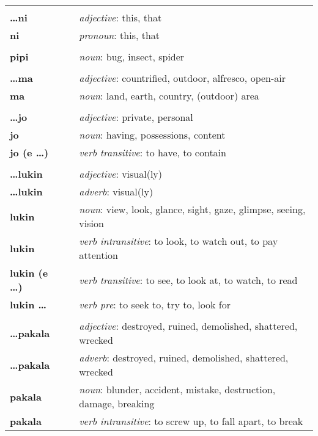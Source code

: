\begin{supertabular}{p{2,5cm}|ll}
 && \\ %
\textbf{\dots ni} && \textit{adjective}: this, that \\ %
\textbf{ni} && \textit{pronoun}: this, that \\ %
 && \\ %
\textbf{pipi} && \textit{noun}: bug, insect, spider \\ %
 && \\ %
\textbf{\dots ma} && \textit{adjective}: countrified, outdoor, alfresco, open-air \\ %
\textbf{ma} && \textit{noun}: land, earth, country, (outdoor) area \\ %
 && \\ %
\textbf{\dots jo} && \textit{adjective}: private, personal \\ %
\textbf{jo} && \textit{noun}: having, possessions, content \\ %
\textbf{jo (e \dots)} && \textit{verb transitive}: to have, to contain \\ %
 && \\ %
\textbf{\dots lukin} && \textit{adjective}: visual(ly) \\ %
\textbf{\dots lukin} && \textit{adverb}: visual(ly) \\ %
\textbf{lukin} && \textit{noun}: view, look, glance, sight, gaze, glimpse, seeing, vision \\ %
\textbf{lukin} && \textit{verb intransitive}: to look, to watch out, to pay attention \\ %
\textbf{lukin (e \dots)} && \textit{verb transitive}: to see, to look at, to watch, to read \\ %
\textbf{lukin \dots} && \textit{verb pre}: to seek to, try to, look for \\ %
 && \\ %
\textbf{\dots pakala} && \textit{adjective}: destroyed, ruined, demolished, shattered, wrecked \\ %
\textbf{\dots pakala} && \textit{adverb}: destroyed, ruined, demolished, shattered, wrecked \\ %
\textbf{pakala} && \textit{noun}: blunder, accident, mistake, destruction, damage, breaking \\ %
\textbf{pakala} && \textit{verb intransitive}: to screw up, to fall apart, to break \\ %

\end{supertabular}

